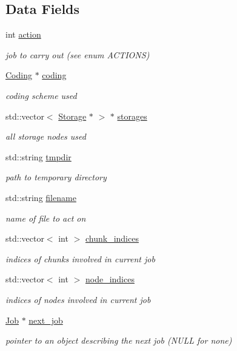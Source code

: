 \subsection*{\-Data \-Fields}
\begin{DoxyCompactItemize}
\item 
int \hyperlink{classJob_a5ac6c3e826332838d56cfb647b894179}{action}
\begin{DoxyCompactList}\small\item\em job to carry out (see enum \-A\-C\-T\-I\-O\-N\-S) \end{DoxyCompactList}\item 
\hyperlink{classCoding}{\-Coding} $\ast$ \hyperlink{classJob_ad78a9a8f3f37b373f0b9212e50e47161}{coding}
\begin{DoxyCompactList}\small\item\em coding scheme used \end{DoxyCompactList}\item 
std\-::vector$<$ \hyperlink{classStorage}{\-Storage} $\ast$ $>$ $\ast$ \hyperlink{classJob_ad53e461116a332c139528df7899f0a9e}{storages}
\begin{DoxyCompactList}\small\item\em all storage nodes used \end{DoxyCompactList}\item 
std\-::string \hyperlink{classJob_a1222a22533b8e17d4e75e2f9b5cecaab}{tmpdir}
\begin{DoxyCompactList}\small\item\em path to temporary directory \end{DoxyCompactList}\item 
std\-::string \hyperlink{classJob_a7611809399acfa1a39f824ff0ad04c21}{filename}
\begin{DoxyCompactList}\small\item\em name of file to act on \end{DoxyCompactList}\item 
std\-::vector$<$ int $>$ \hyperlink{classJob_a27b098f0eb47ccf65e011cea1f738277}{chunk\-\_\-indices}
\begin{DoxyCompactList}\small\item\em indices of chunks involved in current job \end{DoxyCompactList}\item 
std\-::vector$<$ int $>$ \hyperlink{classJob_ae18030f6a246c7fcb12e2048ae367ae5}{node\-\_\-indices}
\begin{DoxyCompactList}\small\item\em indices of nodes involved in current job \end{DoxyCompactList}\item 
\hyperlink{classJob}{\-Job} $\ast$ \hyperlink{classJob_a89cbef000d5b92aa67bac749ffb5b212}{next\-\_\-job}
\begin{DoxyCompactList}\small\item\em pointer to an object describing the next job (\-N\-U\-L\-L for none) \end{DoxyCompactList}\end{DoxyCompactItemize}


